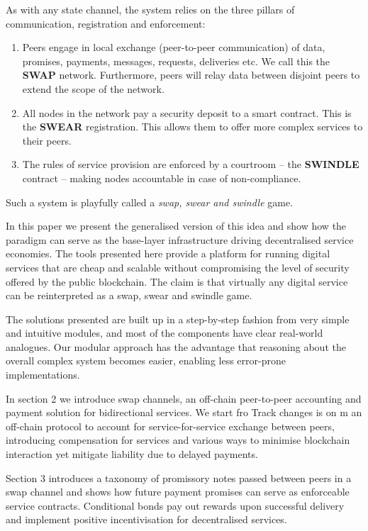 As with any state channel, the system relies on the three pillars of communication, registration and enforcement:
\begin{enumerate}
 \item Peers engage in local exchange (peer-to-peer communication) of data, promises, payments, messages, requests, deliveries etc. We call this the \textbf{SWAP} network. Furthermore, peers will relay data between disjoint peers to extend the scope of the network.
 \item All nodes in the network pay a security deposit to a smart contract. This is the \textbf{SWEAR} registration. This allows them to offer more complex services to their peers.
 \item The rules of service provision are enforced by a courtroom -- the \textbf{SWINDLE} contract -- making nodes accountable in case of non-compliance.
\end{enumerate}

Such a system is playfully called a \emph{swap, swear and swindle} game.

In this paper we present the generalised version of this idea and show how the paradigm can serve as the base-layer infrastructure driving decentralised service economies.
The tools presented here provide a platform for running digital services that are cheap and scalable without compromising the level of security offered by the public blockchain.
The claim is that virtually any digital service can be reinterpreted as a swap, swear and swindle game.

The solutions presented are built up in a step-by-step fashion from very simple and intuitive
modules, %
and most of the components have clear real-world analogues. Our modular approach has the advantage that reasoning about the overall complex system becomes easier, enabling less error-prone implementations.

In section 2 we introduce swap channels, an off-chain peer-to-peer accounting and
payment solution for bidirectional services. We start fro
Track changes is on
m an off-chain protocol to
account for service-for-service exchange between peers, introducing compensation for services
and various ways to minimise blockchain interaction yet mitigate liability due to delayed payments.

Section 3 introduces a taxonomy of promissory notes passed between peers in a swap channel and shows how future payment promises can serve as enforceable service contracts.
Conditional bonds pay out rewards upon successful delivery and
implement positive incentivisation for decentralised services.

